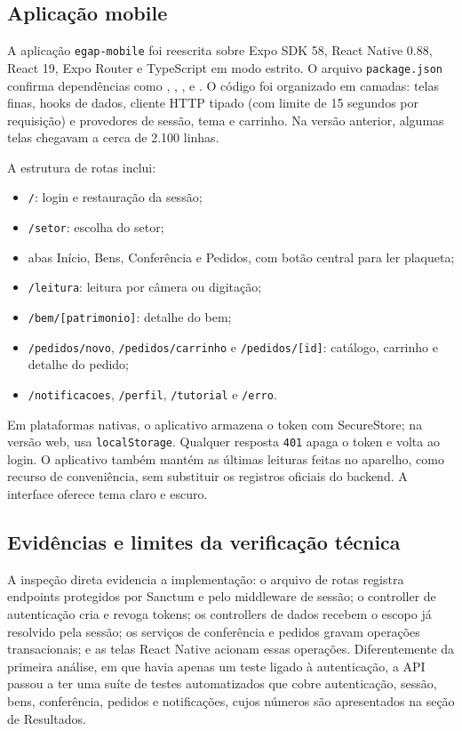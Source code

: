 \documentclass[12pt,a4paper]{article}
\begin{document}
\subsection{Aplicação mobile}

A aplicação \texttt{egap-mobile} foi reescrita sobre Expo SDK 58, React Native 0.88, React 19, Expo Router e TypeScript em modo estrito. O arquivo \texttt{package.json} confirma dependências como , , ,  e . O código foi organizado em camadas: telas finas, hooks de dados, cliente HTTP tipado (com limite de 15 segundos por requisição) e provedores de sessão, tema e carrinho. Na versão anterior, algumas telas chegavam a cerca de 2.100 linhas.

A estrutura de rotas inclui:

\begin{itemize}
    \item \texttt{/}: login e restauração da sessão;
    \item \texttt{/setor}: escolha do setor;
    \item abas Início, Bens, Conferência e Pedidos, com botão central para ler plaqueta;
    \item \texttt{/leitura}: leitura por câmera ou digitação;
    \item \texttt{/bem/[patrimonio]}: detalhe do bem;
    \item \texttt{/pedidos/novo}, \texttt{/pedidos/carrinho} e \texttt{/pedidos/[id]}: catálogo, carrinho e detalhe do pedido;
    \item \texttt{/notificacoes}, \texttt{/perfil}, \texttt{/tutorial} e \texttt{/erro}.
\end{itemize}

Em plataformas nativas, o aplicativo armazena o token com SecureStore; na versão web, usa \texttt{localStorage}. Qualquer resposta \texttt{401} apaga o token e volta ao login. O aplicativo também mantém as últimas leituras feitas no aparelho, como recurso de conveniência, sem substituir os registros oficiais do backend. A interface oferece tema claro e escuro.

\subsection{Evidências e limites da verificação técnica}

A inspeção direta evidencia a implementação: o arquivo de rotas registra endpoints protegidos por Sanctum e pelo middleware de sessão; o controller de autenticação cria e revoga tokens; os controllers de dados recebem o escopo já resolvido pela sessão; os serviços de conferência e pedidos gravam operações transacionais; e as telas React Native acionam essas operações. Diferentemente da primeira análise, em que havia apenas um teste ligado à autenticação, a API passou a ter uma suíte de testes automatizados que cobre autenticação, sessão, bens, conferência, pedidos e notificações, cujos números são apresentados na seção de Resultados.
\end{document}
